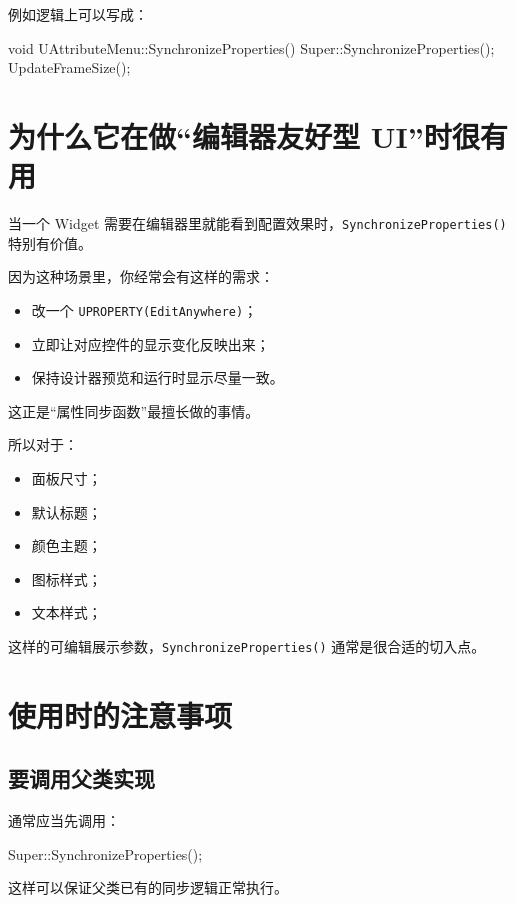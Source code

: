 \documentclass[10pt,CJKmath]{ctexart}
\begin{document}
例如逻辑上可以写成：

\begin{code}
	void UAttributeMenu::SynchronizeProperties()
	{
		Super::SynchronizeProperties();
		UpdateFrameSize();
	}
\end{code}

\section{为什么它在做“编辑器友好型 UI”时很有用}

当一个 Widget 需要在编辑器里就能看到配置效果时，\texttt{SynchronizeProperties()} 特别有价值。

因为这种场景里，你经常会有这样的需求：

\begin{itemize}
	\item 改一个 \texttt{UPROPERTY(EditAnywhere)}；
	\item 立即让对应控件的显示变化反映出来；
	\item 保持设计器预览和运行时显示尽量一致。
\end{itemize}

这正是“属性同步函数”最擅长做的事情。

所以对于：

\begin{itemize}
	\item 面板尺寸；
	\item 默认标题；
	\item 颜色主题；
	\item 图标样式；
	\item 文本样式；
\end{itemize}

这样的可编辑展示参数，\texttt{SynchronizeProperties()} 通常是很合适的切入点。

\section{使用时的注意事项}

\subsection{要调用父类实现}

通常应当先调用：

\begin{code}
	Super::SynchronizeProperties();
\end{code}

这样可以保证父类已有的同步逻辑正常执行。
\end{document}
